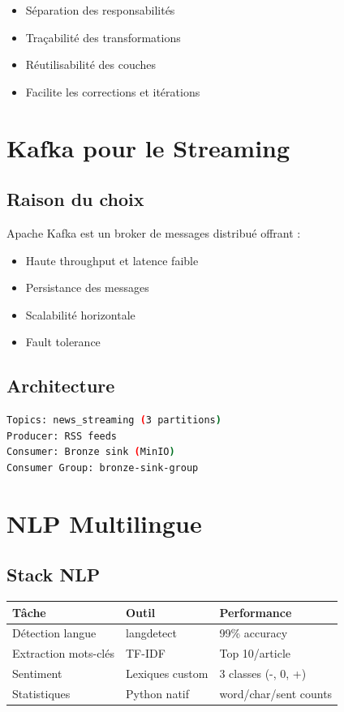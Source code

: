 \documentclass[12pt,a4paper]{report}
\begin{document}
\begin{itemize}
    \item Séparation des responsabilités
    \item Traçabilité des transformations
    \item Réutilisabilité des couches
    \item Facilite les corrections et itérations
\end{itemize}

\section{Kafka pour le Streaming}

\subsection{Raison du choix}

Apache Kafka est un broker de messages distribué offrant :
\begin{itemize}
    \item Haute throughput et latence faible
    \item Persistance des messages
    \item Scalabilité horizontale
    \item Fault tolerance
\end{itemize}

\subsection{Architecture}

\begin{lstlisting}[language=bash, caption={Architecture Kafka}]
Topics: news_streaming (3 partitions)
Producer: RSS feeds
Consumer: Bronze sink (MinIO)
Consumer Group: bronze-sink-group
\end{lstlisting}

\section{NLP Multilingue}

\subsection{Stack NLP}

\begin{table}[H]
    \centering
    \begin{tabular}{lll}
        \toprule
        \textbf{Tâche}       & \textbf{Outil}  & \textbf{Performance}  \\
        \midrule
        Détection langue     & langdetect      & 99\% accuracy         \\
        Extraction mots-clés & TF-IDF          & Top 10/article        \\
        Sentiment            & Lexiques custom & 3 classes (-, 0, +)   \\
        Statistiques         & Python natif    & word/char/sent counts \\
        \bottomrule
    \end{tabular}
\end{table}
\end{document}
